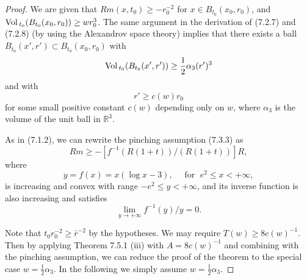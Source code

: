 \begin{proof}
We are given that $Rm(x,t_0)\geq -r^{-2}_0$ for $x \in
B_{t_0}(x_0,r_0)$, and ${\rm Vol}\,_{t_0}(B_{t_0}(x_0,r_0))\geq w r^3_0$.
The same argument in the derivation of (7.2.7) and (7.2.8) (by
using the Alexandrov space theory) implies that there exists a
ball $B_{t_0}(x',r')\subset B_{t_0}(x_0,r_0)$ with \begin{equation}
{\rm Vol}\,_{t_0}(B_{t_0}(x',r'))\geq \frac{1}{2}\alpha_3(r')^3
\end{equation} and with \begin{equation}
r'\geq c(w)r_0 %
\end{equation} for some small positive constant $c(w)$ depending only on $w$,
where $\alpha_3$ is the volume of the unit ball in $\mathbb{R}^3$.

As in (7.1.2), we can rewrite the pinching assumption (7.3.3) as
$$
Rm \geq-[f^{-1}(R(1+t))/(R(1+t))]R,
$$
where
$$
y= f(x) = x(\log x - 3), \quad \mbox{ for }\; e^2 \leq x <
+\infty,
$$
is increasing and convex with range $-e^2 \leq y < +\infty$, and
its inverse function is also increasing and satisfies
$$
\lim_{y\rightarrow +\infty} f^{-1}(y)/y = 0.
$$

Note that $t_0 r^{-2}_0 \geq \bar{r}^{-2}$ by the hypotheses. We
may require $T(w) \geq 8c(w)^{-1}$. Then by applying Theorem 7.5.1
(iii) with $A=8c(w)^{-1}$ and combining with the pinching
assumption, we can reduce the proof of the theorem to the special
case $w=\frac{1}{2}\alpha_3$. In the following we simply assume
$w=\frac{1}{2}\alpha_3$.


\end{proof}
